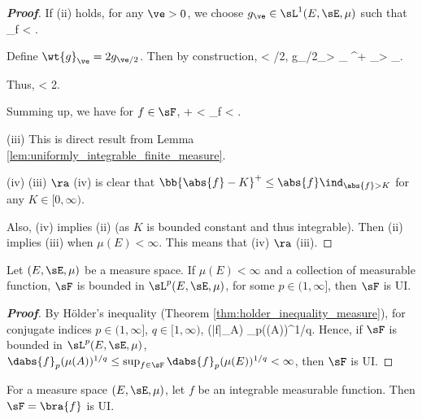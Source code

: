 \begin{proof}[\bf Proof]
If (ii) holds, for any $\ve >0$, we choose $g_\ve \in \sL^1(E,\sE,\mu)$ such that
\be
\sup_{f\in \sF}\mu{} < \ve.
\ee

Define $\wt{g}_\ve = 2g_{\ve/2}$. Then by construction, \be \mu{} \leq \mu{} < \ve/2, \qquad g_{\ve/2}\ind_{>
_\ve} \leq  {}^+ \ind_{> _\ve}. \ee

Thus,
\be
\mu{} \leq \mu{} <  \frac{\ve}2.
\ee

Summing up, we have for $f\in \sF$,
\be
\mu{} \leq  \mu{} + \mu{} < \ve\quad  \ra \quad
\sup_{f\in \sF} \mu{} < \ve.
\ee

\item [(iii)] This is direct result from Lemma \ref{lem:uniformly_integrable_finite_measure}.
\item [(iv)] (iii) $\ra$ (iv) is clear that $\bb{\abs{f}-K}^+ \leq \abs{f}\ind_{\abs{f}>K}$ for any $K\in [0,\infty)$.

Also, (iv) implies (ii) (as $K$ is bounded constant and thus integrable). Then (ii) implies (iii) when $\mu(E) < \infty$. This means that (iv) $\ra$ (iii).
\een
\end{proof}




\begin{proposition}\label{pro:slp_implies_ui}
Let $(E,\sE,\mu)$ be a measure space. If $\mu(E)<\infty$ and a collection of measurable function, $\sF$ is bounded in $\sL^p(E,\sE,\mu)$, for some $p \in (1,\infty]$, then $\sF$ is UI.
\end{proposition}
\begin{proof}[\bf Proof]
By H\"older's inequality (Theorem \ref{thm:holder_inequality_measure}), for conjugate indices $p \in (1,\infty]$, $q \in [1,\infty)$, \be \mu(|f|\ind_A) \leq {}_p(\mu(A))^{1/q}. \ee Hence, if
$\sF$ is bounded in $\sL^p(E,\sE,\mu)$, $\dabs{f}_p(\mu(A))^{1/q} \leq \sup_{f\in \sF}\dabs{f}_p (\mu(E))^{1/q} < \infty$, then $\sF$ is UI.
\end{proof}



\begin{lemma}\label{lem:single_integrable_function_ui}
For a measure space $(E,\sE,\mu)$, let $f$ be an integrable measurable function. Then $\sF = \bra{f}$ is UI.
\end{lemma}


